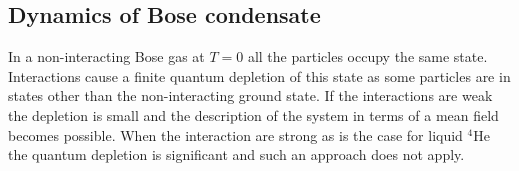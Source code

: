 
\subsection{Dynamics of Bose condensate} %
In a non-interacting Bose gas at $T=0$ all the particles occupy the same state.
Interactions cause a finite quantum depletion of this state as some particles are in states other than the non-interacting ground state.
If the interactions are weak the depletion is small and the description of the system in terms of a mean field becomes possible.
When the interaction are strong as is the case for liquid $\mathrm{^4He}$ the quantum depletion is significant and such an approach does not apply. 



